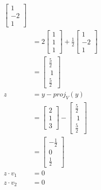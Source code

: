 \documentclass{article}
\theoremstyle{mytheoremstyle}
\theoremstyle{mytheoremstyle}
\theoremstyle{myproblemstyle}
\begin{document}
\begin{align*}
\begin{bmatrix}
            1 \\ -2 \\ 1
        \end{bmatrix} \\
        &= 2 \begin{bmatrix}
            1 \\ 1 \\ 1
        \end{bmatrix}
        + \frac{1}{2} \begin{bmatrix}
            1 \\ -2 \\ 1
        \end{bmatrix} \\
        &= \begin{bmatrix}
            \frac{5}{2} \\\ 1 \\ \frac{5}{2}
        \end{bmatrix} \\
        z &= y-proj_V(y) \\
        &= \begin{bmatrix}
            2 \\ 1 \\ 3
        \end{bmatrix} - \begin{bmatrix}
            \frac{5}{2} \\\ 1 \\ \frac{5}{2}
        \end{bmatrix} \\
        &= \begin{bmatrix}
            -\frac{1}{2} \\ 0 \\ \frac{1}{2}
        \end{bmatrix} \\
        z\cdot v_1 &= 0 \\
        z\cdot v_2 &= 0
    \end{align*}
\end{document}
